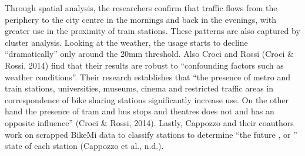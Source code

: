 \documentclass[letterpaper,10pt,english]{jupyterBook}
\begin{document}
\sphinxAtStartPar
Through spatial analysis, the researchers confirm that traffic flows from the periphery to the city centre in the mornings and back in the evenings, with greater use in the proximity of train stations. These patterns are also captured by cluster analysis. Looking at the weather, the usage starts to decline “dramatically” only around the 20mm threshold. Also Croci and Rossi (Croci \& Rossi, 2014) find that their results are robust to “confounding factors such as weather conditions”. Their research establishes that “the presence of metro and train stations, universities, museums, cinema and restricted traffic areas in correspondence of bike sharing stations significantly increase use. On the other hand the presence of tram and bus stops and theatres does not and has an opposite influence” (Croci \& Rossi, 2014). Lastly, Cappozzo and their coauthors work on scrapped BikeMi data to classify stations to determine “the future ,  or ” state of each station (Cappozzo et al., n.d.).
\end{document}
